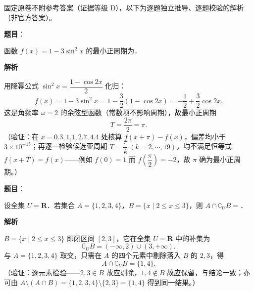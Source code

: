 
\begin{gktip}
固定原卷不附参考答案（证据等级 D），以下为逐题独立推导、逐题校验的解析（非官方答案）。
\end{gktip}

\begin{answer}

\textbf{题目}：

函数 \(f(x)=1-3\sin^{2}x\) 的最小正周期为\gkblank{}．

\textbf{解析}

用降幂公式 \(\sin^{2}x=\dfrac{1-\cos 2x}{2}\) 化归：
\nopagebreak[4]
\[
f(x)=1-3\sin^{2}x=1-\frac{3}{2}(1-\cos 2x)=-\frac{1}{2}+\frac{3}{2}\cos 2x.
\]
这是角频率 \(\omega=2\) 的余弦型函数（常数项不影响周期），故最小正周期
\nopagebreak[4]
\[
T=\frac{2\pi}{2}=\pi.
\]
（验证：在 \(x=0.3,1.1,2.7,4.4\) 处核算 \(f(x+\pi)-f(x)\)，偏差均小于 \(3\times10^{-15}\)；再逐一检验候选亚周期 \(T=\dfrac{\pi}{k}\ (k=2,\cdots,19)\)，均不满足恒等式 \(f(x+T)=f(x)\)——例如 \(f(0)=1\) 而 \(f\left(\dfrac{\pi}{2}\right)=-2\)，故 \(\pi\) 确为最小正周期。）


\end{answer}
\begin{answer}

\textbf{题目}：

设全集 \(U=\mathbf{R}\)．若集合 \(A=\{1,2,3,4\}\)，\(B=\{x\mid 2\leqslant x\leqslant 3\}\)，则 \(A\cap\complement_{U}B=\)\gkblank{}．

\textbf{解析}

\(B=\{x\mid 2\leqslant x\leqslant 3\}\) 即闭区间 \([2,3]\)，它在全集 \(U=\mathbf{R}\) 中的补集为
\nopagebreak[4]
\[
\complement_{U}B=(-\infty,2)\cup(3,+\infty).
\]
与 \(A=\{1,2,3,4\}\) 取交，只需在 \(A\) 的四个元素中剔除落入 \(B\) 的 \(2,3\)，得
\nopagebreak[4]
\[
A\cap\complement_{U}B=\{1,4\}.
\]
（验证：逐元素检验——\(2,3\in B\) 故应剔除，\(1,4\notin B\) 故应保留，与结论一致；亦可由 \(A\setminus(A\cap B)=\{1,2,3,4\}\setminus\{2,3\}=\{1,4\}\) 得到同一结果。）


\end{answer}

